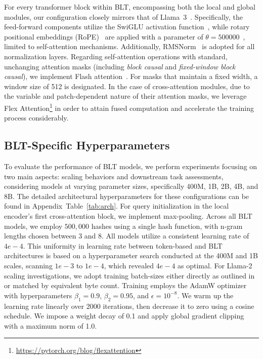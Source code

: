 For every transformer block within {\textsc BLT}, encompassing both the local and global modules, our configuration closely mirrors that of Llama~3~\citep{dubey2024llama}. Specifically, the feed-forward components utilize the SwiGLU activation function~\citep{swiglu}, while rotary positional embeddings (RoPE)~\citep{RoPe} are applied with a parameter of $\theta=500000$~\citep{xiong2024effective}, limited to self-attention mechanisms. Additionally, RMSNorm~\citep{RMSNorm} is adopted for all normalization layers. Regarding self-attention operations with standard, unchanging attention masks (including \textit{block causal} and \textit{fixed-window block causal}), we implement Flash attention~\citep{dao2022flashattention}. For masks that maintain a fixed width, a window size of 512 is designated. In the case of cross-attention modules, due to the variable and patch-dependent nature of their attention masks, we leverage Flex Attention\footnote{\url{https://pytorch.org/blog/flexattention}} in order to attain fused computation and accelerate the training process considerably.

\subsection{{\textsc BLT}-Specific Hyperparameters} To evaluate the performance of {\textsc BLT} models, we perform experiments focusing on two main aspects: scaling behaviors and downstream task assessments, considering models at varying parameter sizes, specifically 400M, 1B, 2B, 4B, and 8B. The detailed architectural hyperparameters for these configurations can be found in Appendix~Table~\ref{tab:arch}. For query initialization in the local encoder’s first cross-attention block, we implement max-pooling. Across all {\textsc BLT} models, we employ $500,000$ hashes using a single hash function, with n-gram lengths chosen between 3 and 8. All models utilize a consistent learning rate of $4e-4$. This uniformity in learning rate between token-based and {\textsc BLT} architectures is based on a hyperparameter search conducted at the 400M and 1B scales, scanning $1e-3$ to $1e-4$, which revealed $4e-4$ as optimal. For Llama-2 scaling investigations, we adopt training batch-sizes either directly as outlined in~\cite{dubey2024llama} or matched by equivalent byte count. Training employs the AdamW optimizer~\citep{adamw} with hyperparameters $\beta_1=0.9$, $\beta_2=0.95$, and $\epsilon=10^{-8}$. We warm up the learning rate linearly over 2000 iterations, then decrease it to zero using a cosine schedule. We impose a weight decay of 0.1 and apply global gradient clipping with a maximum norm of 1.0.

